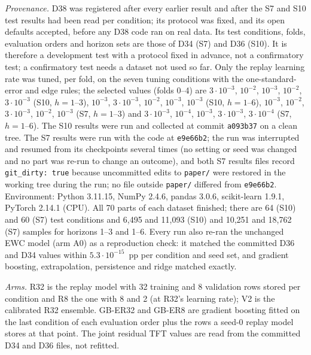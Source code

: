 \documentclass[conference]{IEEEtran}
\begin{document}
\emph{Provenance.} D38 was registered after every earlier result and after the S7 and S10 test results had been read per
condition; its protocol was fixed, and its open defaults accepted, before any D38 code ran on real data. Its test
conditions, folds, evaluation orders and horizon sets are those of D34 (S7) and D36 (S10). It is therefore a development
test with a protocol fixed in advance, not a confirmatory test; a confirmatory test needs a dataset not used so far.
Only the replay learning rate was tuned, per fold, on the seven tuning conditions with the one-standard-error and edge
rules; the selected values (folds 0--4) are $3\cdot10^{-3}$, $10^{-2}$, $10^{-3}$, $10^{-2}$, $3\cdot10^{-3}$ (S10,
$h{=}1$--3), $10^{-3}$, $3\cdot10^{-3}$, $10^{-2}$, $10^{-3}$, $10^{-3}$ (S10, $h{=}1$--6), $10^{-3}$, $10^{-2}$,
$3\cdot10^{-3}$, $10^{-2}$, $10^{-3}$ (S7, $h{=}1$--3) and $3\cdot10^{-3}$, $10^{-4}$, $10^{-3}$, $3\cdot10^{-3}$,
$3\cdot10^{-4}$ (S7, $h{=}1$--6). The S10 results were run and collected at commit \texttt{a093b37} on a clean tree. The
S7 results were run with the code at \texttt{e9e66b2}; the run was interrupted and resumed from its checkpoints several
times (no setting or seed was changed and no part was re-run to change an outcome), and both S7 results files record
\texttt{git\_dirty: true} because uncommitted edits to \texttt{paper/} were restored in the working tree during the run;
no file outside \texttt{paper/} differed from \texttt{e9e66b2}. Environment: Python 3.11.15, NumPy 2.4.6, pandas 3.0.6,
scikit-learn 1.9.1, PyTorch 2.14.1 (CPU). All 70 parts of each dataset finished; there are 64 (S10) and 60 (S7) test
conditions and 6{,}495 and 11{,}093 (S10) and 10{,}251 and 18{,}762 (S7) samples for horizons 1--3 and 1--6. Every
run also re-ran the unchanged EWC model (arm A0) as a reproduction check: it matched the committed D36 and D34 values
within $5.3\cdot10^{-15}$~pp per condition and seed set, and gradient boosting, extrapolation, persistence and ridge
matched exactly.

\emph{Arms.} R32 is the replay model with 32 training and 8 validation rows stored per condition and R8 the one with
8 and 2 (at R32's learning rate); V2 is the calibrated R32 ensemble. GB-ER32 and GB-ER8 are gradient boosting fitted on
the last condition of each evaluation order plus the rows a seed-0 replay model stores at that point. The joint residual
TFT values are read from the committed D34 and D36 files, not refitted.
\end{document}
